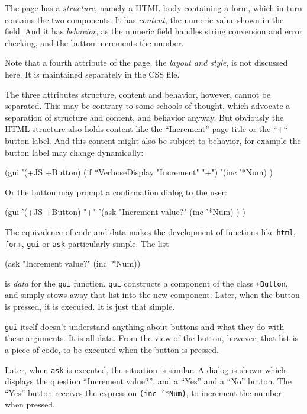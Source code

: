 The page has a \textit{structure}, namely a HTML body containing a form, which in turn
contains the two components. It has \textit{content}, the numeric value shown in the
field. And it has \textit{behavior}, as the numeric field handles string conversion
and error checking, and the button increments the number.

Note that a fourth attribute of the page, the \textit{layout and style}, is not
discussed here. It is maintained separately in the CSS file.

The three attributes structure, content and behavior, however, cannot be
separated. This may be contrary to some schools of thought, which advocate a
separation of structure and content, and behavior anyway. But obviously the HTML
structure also holds content like the ``Increment'' page title or the ``+`` button
label. And this content might also be subject to behavior, for example the
button label may change dynamically:
\begin{wideverbatim}
   (gui '(+JS +Button)
      (if *VerboseDisplay "Increment" "+")
      '(inc '*Num) )
\end{wideverbatim}

Or the button may prompt a confirmation dialog to the user:
\begin{wideverbatim}
   (gui '(+JS +Button) "+"
      '(ask "Increment value?"
         (inc '*Num) ) )
\end{wideverbatim}

The equivalence of code and data makes the development of functions like
\texttt{html}, \texttt{form}, \texttt{gui} or \texttt{ask} particularly simple. The list
\begin{wideverbatim}
   (ask "Increment value?" (inc '*Num))
\end{wideverbatim}

is \textit{data} for the \texttt{gui} function. \texttt{gui} constructs a component of the class
\texttt{+Button}, and simply stows away that list into the new component. Later, when
the button is pressed, it is executed. It is just that simple.

\texttt{gui} itself doesn't understand anything about buttons and what they do with
these arguments. It is all data. From the view of the button, however, that list
is a piece of code, to be executed when the button is pressed.

Later, when \texttt{ask} is executed, the situation is similar. A dialog is shown
which displays the question ``Increment value?'', and a ``Yes'' and a ``No'' button.
The ``Yes'' button receives the expression \texttt{(inc '*Num)}, to increment the number
when pressed.

